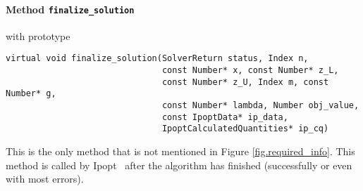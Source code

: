 \documentclass[10pt]{article}
\newcommand{\Ipopt}{{\sc Ipopt }}
\begin{document}
\paragraph{Method \texttt{finalize\_solution}} with prototype

\begin{verbatim}
virtual void finalize_solution(SolverReturn status, Index n,
                               const Number* x, const Number* z_L,
                               const Number* z_U, Index m, const Number* g,
                               const Number* lambda, Number obj_value,
                               const IpoptData* ip_data,
                               IpoptCalculatedQuantities* ip_cq)
\end{verbatim}
This is the only method that is not mentioned in Figure
\ref{fig.required_info}. This method is called by \Ipopt\ after the
algorithm has finished (successfully or even with most errors).
\end{document}
